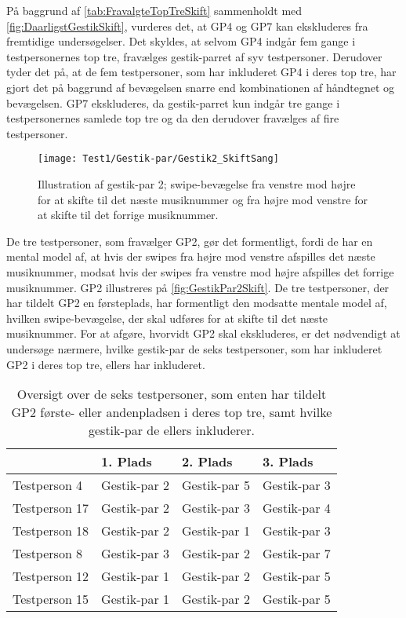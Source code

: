 \noindent
%
På baggrund af \autoref{tab:FravalgteTopTreSkift} sammenholdt med \autoref{fig:DaarligstGestikSkift}, vurderes det, at GP4 og GP7 kan ekskluderes fra fremtidige undersøgelser. Det skyldes, at selvom GP4 indgår fem gange i testpersonernes top tre, fravælges gestik-parret af syv testpersoner. Derudover tyder det på, at de fem testpersoner, som har inkluderet GP4 i deres top tre, har gjort det på baggrund af bevægelsen snarre end kombinationen af håndtegnet og bevægelsen. GP7 ekskluderes, da gestik-parret kun indgår tre gange i testpersonernes samlede top tre og da den derudover fravælges af fire testpersoner. 
%
\begin{figure}[H]
	\centering
	\texttt{[image: Test1/Gestik-par/Gestik2\_SkiftSang]}
	\caption{Illustration af gestik-par 2; swipe-bevægelse fra venstre mod højre for at skifte til det næste musiknummer og fra højre mod venstre for at skifte til det forrige musiknummer.}
	\label{fig:GestikPar2Skift}
\end{figure}
\noindent
%
De tre testpersoner, som fravælger GP2, gør det formentligt, fordi de har en mental model af, at hvis der swipes fra højre mod venstre afspilles det næste musiknummer, modsat hvis der swipes fra venstre mod højre afspilles det forrige musiknummer. GP2 illustreres på \autoref{fig:GestikPar2Skift}. De tre testpersoner, der har tildelt GP2 en førsteplads, har formentligt den modsatte mentale model af, hvilken swipe-bevægelse, der skal udføres for at skifte til det næste musiknummer. For at afgøre, hvorvidt GP2 skal ekskluderes, er det nødvendigt at undersøge nærmere, hvilke gestik-par de seks testpersoner, som har inkluderet GP2 i deres top tre, ellers har inkluderet. 
%
\begin{table}[H]
	\centering
	\begin{tabular}{ | p{3cm} | p{3cm} | p{3cm} | p{3cm} |}
	\hline
		 & 1. Plads & 2. Plads & 3. Plads \\ \hline
		Testperson 4 & Gestik-par 2 & Gestik-par 5 & Gestik-par 3 \\ \hline
		Testperson 17 & Gestik-par 2 & Gestik-par 3 & Gestik-par 4 \\ \hline
		Testperson 18 & Gestik-par 2 & Gestik-par 1 & Gestik-par 3 \\ \hline
		Testperson 8 & Gestik-par 3 & Gestik-par 2 & Gestik-par 7 \\ \hline
		Testperson 12 & Gestik-par 1 & Gestik-par 2 & Gestik-par 5\\ \hline
		Testperson 15 & Gestik-par 1 & Gestik-par 2 & Gestik-par 5 \\ \hline
	\end{tabular}
	\caption{Oversigt over de seks testpersoner, som enten har tildelt GP2 første- eller andenpladsen i deres top tre, samt hvilke gestik-par de ellers inkluderer.}
	\label{tab:GestikPar2ITopTre}
\end{table}

